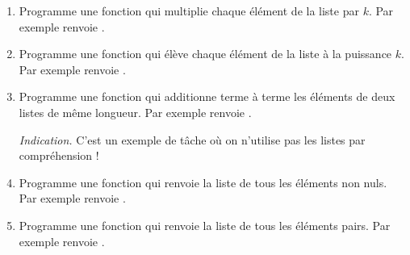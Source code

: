 \documentclass[11pt,class=report,crop=false]{standalone}
\begin{document}
\begin{activite}


\begin{enumerate}
  \item Programme une fonction  qui multiplie chaque élément de la liste par $k$. Par exemple  renvoie \ci{[2,4,6,8,10]}.
  
  \item Programme une fonction  qui élève chaque élément de la liste à la puissance $k$. Par exemple  renvoie \ci{[1,8,27,64,125]}.
  
  \item Programme une fonction  qui additionne terme à terme les éléments de deux listes de même longueur. Par exemple  renvoie \ci{[5,7,9]}.
  
  \emph{Indication.} C'est un exemple de tâche où on n'utilise pas les listes par compréhension !
  

  \item Programme une fonction  qui renvoie la liste de tous les éléments non nuls. Par exemple  renvoie \ci{[1,2,3,4,5]}.
  
  \item Programme une fonction  qui renvoie la liste de tous les éléments pairs. Par exemple  renvoie \ci{[0,2,0,4,0]}.
  
\end{enumerate}

\end{activite}



\end{document}
